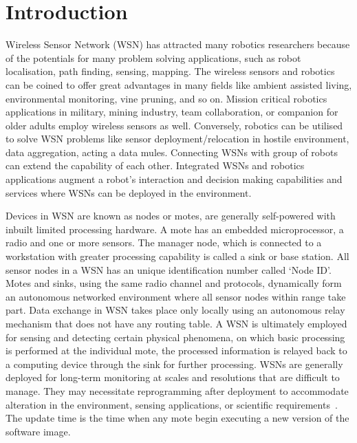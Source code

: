 \documentclass[conference,manuscript]{IEEEtran}
\begin{document}
\section{Introduction}
\label{sec:intro}

Wireless Sensor Network (WSN) has attracted many robotics researchers because of the potentials for many problem solving applications, such as robot localisation, path finding, sensing, mapping. 
The wireless sensors and robotics can be coined to offer great advantages in many fields like ambient assisted living, environmental monitoring, vine pruning, and so on.
Mission critical robotics applications in military, mining industry, team collaboration, or companion for older adults employ wireless sensors as well.
Conversely, robotics can be utilised to solve WSN problems like sensor deployment/relocation in hostile environment, data aggregation, acting a data mules.
Connecting WSNs with group of robots can extend the capability of each other.
Integrated WSNs and robotics applications augment a robot's interaction and decision making capabilities and services where WSNs can be deployed in the environment.

Devices in WSN are known as nodes or motes, are generally self-powered with inbuilt limited processing hardware.
A mote has an embedded microprocessor, a radio and one or more sensors.
The manager node, which is connected to a workstation with greater processing capability is called a sink or base station. 
All sensor nodes in a WSN has an unique identification number called `Node ID'.
Motes and sinks, using the same radio channel and protocols,  dynamically form an autonomous networked environment where all sensor nodes within range take part.
Data exchange in WSN takes place only locally using an autonomous relay mechanism that does not have any routing table. 
A WSN is ultimately employed for sensing and detecting certain physical phenomena, on which basic processing is performed at the individual mote, the processed information is relayed back to a computing device  through the sink for further processing.
WSNs are generally deployed for long-term monitoring at scales and resolutions that are difficult to manage. 
They may necessitate reprogramming after deployment to accommodate alteration in the environment, sensing applications, or scientific requirements~\cite{ISI:000253439700120}.
The update time is the time when any mote begin executing a new version of the software image.
\end{document}
